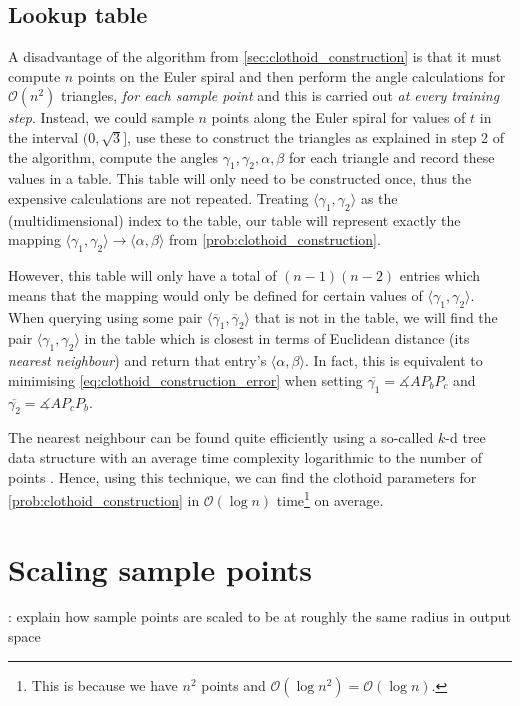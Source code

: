\subsection{Lookup table}
A disadvantage of the algorithm from \ref{sec:clothoid_construction} is that it must compute $n$ points on the Euler spiral and then perform the angle calculations for $\mathcal{O}(n^2)$ triangles, \textit{for each sample point} and this is carried out \textit{at every training step}.
Instead, we could sample $n$ points along the Euler spiral for values of $t$ in the interval $(0, \sqrt{3}]$, use these to construct the triangles as explained in step 2 of the algorithm, compute the angles $\gamma_1,\gamma_2,\alpha,\beta$ for each triangle and record these values in a table.
This table will only need to be constructed once, thus the expensive calculations are not repeated.
Treating $\langle\gamma_1,\gamma_2\rangle$ as the (multidimensional) index to the table, our table will represent exactly the mapping $\langle\gamma_1,\gamma_2\rangle\rightarrow\langle\alpha,\beta\rangle$ from \ref{prob:clothoid_construction}.

However, this table will only have a total of $(n-1)(n-2)$ entries which means that the mapping would only be defined for certain values of $\langle\gamma_1,\gamma_2\rangle$.
When querying using some pair $\langle\overline{\gamma}_1,\overline{\gamma}_2\rangle$ that is not in the table, we will find the pair $\langle\gamma_1,\gamma_2\rangle$ in the table which is closest in terms of Euclidean distance (its \textit{nearest neighbour}) and return that entry's $\langle \alpha,\beta\rangle$.
In fact, this is equivalent to minimising \ref{eq:clothoid_construction_error} when setting $\overline{\gamma_1} = \measuredangle{AP_bP_c}$ and $\overline{\gamma_2} = \measuredangle{AP_cP_b}$.

The nearest neighbour can be found quite efficiently using a so-called $k$-d tree data structure with an average time complexity logarithmic to the number of points \cite{friedman1977}.
Hence, using this technique, we can find the clothoid parameters for \ref{prob:clothoid_construction} in $\mathcal{O}(\log n)$ time\footnote{This is because we have $n^2$ points and $\mathcal{O}(\log{n^2})=\mathcal{O}(\log n)$.} on average.

\section{Scaling sample points}
\todo: explain how sample points are scaled to be at roughly the same radius in output space

